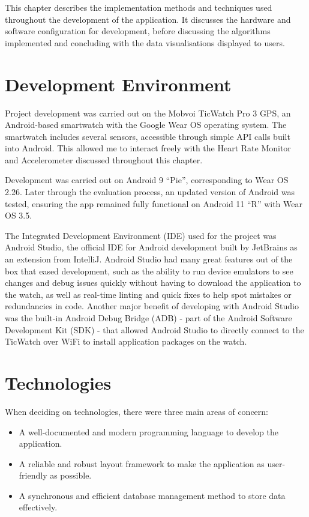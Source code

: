 \documentclass{l4proj}
\begin{document}
This chapter describes the implementation methods and techniques used throughout the development of the application. It discusses the hardware and software configuration for development, before discussing the algorithms implemented and concluding with the data visualisations displayed to users.

\section{Development Environment}
\label{sec:devenv}

Project development was carried out on the Mobvoi TicWatch Pro 3 GPS, an Android-based smartwatch with the Google Wear OS operating system. The smartwatch includes several sensors, accessible through simple API calls built into Android. This allowed me to interact freely with the Heart Rate Monitor and Accelerometer discussed throughout this chapter. 

Development was carried out on Android 9 “Pie”, corresponding to Wear OS 2.26. Later through the evaluation process, an updated version of Android was tested, ensuring the app remained fully functional on Android 11 “R” with Wear OS 3.5.

The Integrated Development Environment (IDE) used for the project was Android Studio, the official IDE for Android development built by JetBrains as an extension from IntelliJ. Android Studio had many great features out of the box that eased development, such as the ability to run device emulators to see changes and debug issues quickly without having to download the application to the watch, as well as real-time linting and quick fixes to help spot mistakes or redundancies in code. Another major benefit of developing with Android Studio was the built-in Android Debug Bridge (ADB) - part of the Android Software Development Kit (SDK) - that allowed Android Studio to directly connect to the TicWatch over WiFi to install application packages on the watch.

\section{Technologies}
\label{sec:technologies}

When deciding on technologies, there were three main areas of concern:

\begin{itemize}
    \item A well-documented and modern programming language to develop the application.
    \item A reliable and robust layout framework to make the application as user-friendly as possible.
    \item A synchronous and efficient database management method to store data effectively.
\end{itemize}
\end{document}
